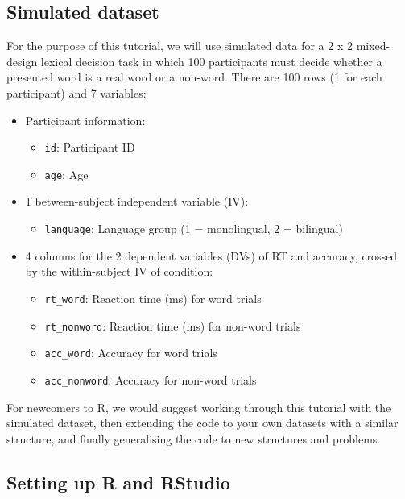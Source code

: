 \documentclass[
  english,
  doc,floatsintext]{apa6}
\providecommand{\tightlist}{%
  \setlength{\itemsep}{0pt}\setlength{\parskip}{0pt}}
\begin{document}
\hypertarget{simulated-dataset}{%
\subsection{Simulated dataset}\label{simulated-dataset}}

For the purpose of this tutorial, we will use simulated data for a 2 x 2 mixed-design lexical decision task in which 100 participants must decide whether a presented word is a real word or a non-word. There are 100 rows (1 for each participant) and 7 variables:

\begin{itemize}
\item
  Participant information:

  \begin{itemize}
  \tightlist
  \item
    \texttt{id}: Participant ID
  \item
    \texttt{age}: Age
  \end{itemize}
\item
  1 between-subject independent variable (IV):

  \begin{itemize}
  \tightlist
  \item
    \texttt{language}: Language group (1 = monolingual, 2 = bilingual)
  \end{itemize}
\item
  4 columns for the 2 dependent variables (DVs) of RT and accuracy, crossed by the within-subject IV of condition:

  \begin{itemize}
  \tightlist
  \item
    \texttt{rt\_word}: Reaction time (ms) for word trials
  \item
    \texttt{rt\_nonword}: Reaction time (ms) for non-word trials
  \item
    \texttt{acc\_word}: Accuracy for word trials
  \item
    \texttt{acc\_nonword}: Accuracy for non-word trials
  \end{itemize}
\end{itemize}

For newcomers to R, we would suggest working through this tutorial with the simulated dataset, then extending the code to your own datasets with a similar structure, and finally generalising the code to new structures and problems.

\hypertarget{setting-up-r-and-rstudio}{%
\subsection{Setting up R and RStudio}\label{setting-up-r-and-rstudio}}
\end{document}
